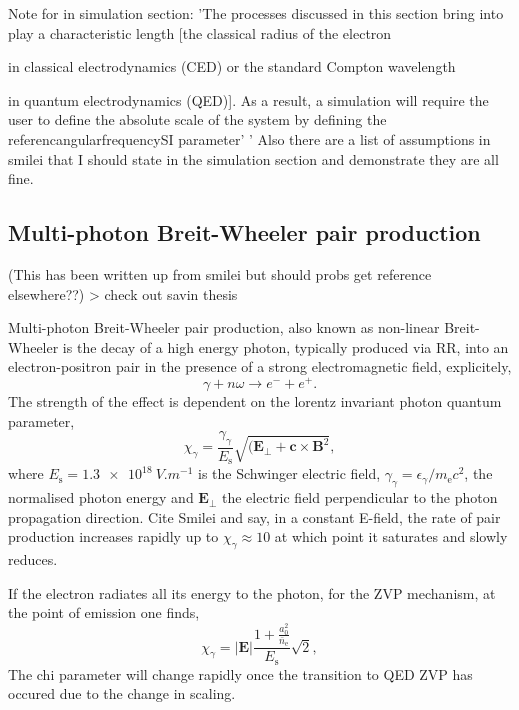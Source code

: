 Note for in simulation section: 'The processes discussed in this section bring into play a characteristic length [the classical radius of the electron 

in classical electrodynamics (CED) or the standard Compton wavelength 

in quantum electrodynamics (QED)]. As a result, a simulation will require the user to define the absolute scale of the system by defining the referencangularfrequencySI parameter' '
Also there are a list of assumptions in smilei that I should state in the simulation section and demonstrate they are all fine.

\subsection{Multi-photon Breit-Wheeler pair production}

(This has been written up from smilei but should probs get reference elsewhere??) > check out savin thesis

Multi-photon Breit-Wheeler pair production, also known as non-linear Breit-Wheeler is the decay of a high energy photon, typically produced via \ac{RR}, into an electron-positron pair in the presence of a strong electromagnetic field, explicitely,
\begin{equation}
	\gamma + n\omega \to e^- + e^+.
\end{equation}
The strength of the effect is dependent on the lorentz invariant photon quantum parameter,
\begin{equation}
	\chi_\gamma = \frac{\gamma_\gamma}{E_\mathrm{s}} \sqrt{(\mathbf{E}_\perp + \mathbf{c}\times \mathbf{B}^2},
\end{equation}
where $E_\mathrm{s} = \qty{1.3e18}{V.m^{-1}}$ is the Schwinger electric field, $\gamma_\gamma = \epsilon_\gamma /m_\mathrm{e}c^2$, the normalised photon energy and $\mathbf{E}_\perp$ the electric field perpendicular to the photon propagation direction. Cite Smilei and say, in a constant E-field, the rate of pair production increases rapidly up to $\chi_\gamma \approx 10$ at which point it saturates and slowly reduces.


If the electron radiates all its energy to the photon, for the ZVP mechanism, at the point of emission one finds,
\begin{equation}
	\chi_\gamma = |\mathbf{E}|\frac{1 + \frac{a^2_0}{\bar{n}_\mathrm{e}}}{E_\mathrm{s}} \sqrt{2},
\end{equation}
The chi parameter will change rapidly once the transition to QED ZVP has occured due to the change in scaling.


